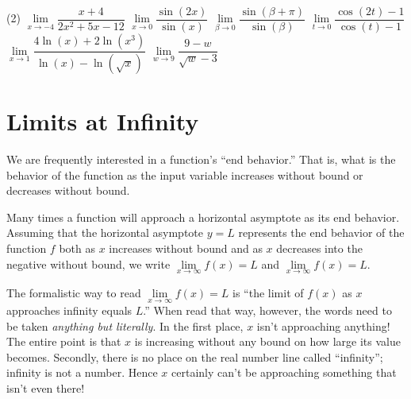 \documentclass[10pt,oneside,]{book}
\theoremstyle{plain}
\theoremstyle{definition}
\numberwithin{equation}{section}
\newcommand{\fe}[2]{#1\mathopen{}\left(#2\right)\mathclose{}}
\begin{document}
\par
\begin{exercisegroup}(2)
\exercise[2.]\hypertarget{exercise-73}{\null}\(\lim\limits_{x\to-4}\dfrac{x+4}{2x^2+5x-12}\)%
\exercise[3.]\hypertarget{exercise-74}{\null}\(\lim\limits_{x\to0}\dfrac{\fe{\sin}{2x}}{\fe{\sin}{x}}\)%
\exercise[4.]\hypertarget{exercise-75}{\null}\(\lim\limits_{\beta\to0}\dfrac{\fe{\sin}{\beta+\pi}}{\fe{\sin}{\beta}}\)%
\exercise[5.]\hypertarget{exercise-76}{\null}\(\lim\limits_{t\to0}\dfrac{\fe{\cos}{2t}-1}{\fe{\cos}{t}-1}\)%
\exercise[6.]\hypertarget{exercise-77}{\null}\(\lim\limits_{x\to1}\dfrac{4\fe{\ln}{x}+2\fe{\ln}{x^3}}{\fe{\ln}{x}-\fe{\ln}{\sqrt{x}}}\)%
\exercise[7.]\hypertarget{exercise-78}{\null}\(\lim\limits_{w\to9}\dfrac{9-w}{\sqrt{w}-3}\)%
\end{exercisegroup}
\par\smallskip\noindent
\typeout{************************************************}
\typeout{************************************************}
\section[Limits at Infinity]{Limits at Infinity}\label{section-limits-at-infinity}
We are frequently interested in a function's ``end behavior.'' That is, what is the behavior of the function as the input variable increases without bound or decreases without bound.%
\par
Many times a function will approach a horizontal asymptote as its end behavior. Assuming that the horizontal asymptote \(y=L\) represents the end behavior of the function \(f\) both as \(x\) increases without bound and as \(x\) decreases into the negative without bound, we write \(\lim\limits_{x\to\infty}\fe{f}{x}=L\) and \(\lim\limits_{x\to\infty}\fe{f}{x}=L\).%
\par
The formalistic way to read \(\lim\limits_{x\to\infty}\fe{f}{x}=L\) is ``the limit of \(\fe{f}{x}\) as \(x\) approaches infinity equals \(L\).'' When read that way, however, the words need to be taken \emph{anything but literally}. In the first place, \(x\) isn't approaching anything! The entire point is that \(x\) is increasing without any bound on how large its value becomes. Secondly, there is no place on the real number line called ``infinity''; infinity is not a number. Hence \(x\) certainly can't be approaching something that isn't even there!%
\typeout{************************************************}
\typeout{************************************************}
\end{document}
